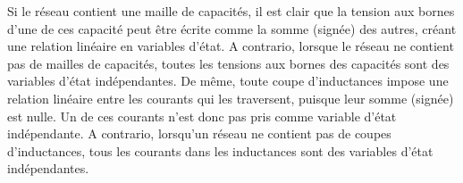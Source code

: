 Si le réseau contient une maille de capacités, il est clair que la tension aux bornes d'une de ces capacité peut être écrite comme la somme (signée) des autres, créant une relation linéaire en variables d'état. A contrario, lorsque le réseau ne contient pas de mailles de capacités, toutes
les tensions aux bornes des capacités sont des variables d'état indépendantes.
De même, toute coupe d'inductances impose une relation linéaire entre les courants qui les traversent, puisque leur somme (signée) est nulle. Un de ces courants n'est donc pas pris comme variable d'état indépendante. A contrario, lorsqu'un réseau ne contient pas de coupes d'inductances,
tous les courants dans les inductances sont des variables d'état indépendantes. 
